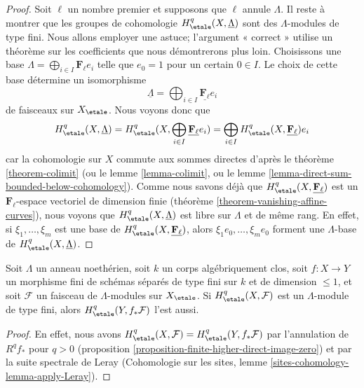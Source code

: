 \begin{proof}
\medskip\noindent
Soit $\ell$ un nombre premier et supposons que $\ell$ annule $\Lambda$.
Il reste à montrer que les groupes de cohomologie
$H^q_\etale(X, \underline{\Lambda})$ sont des $\Lambda$-modules de type fini.
Nous allons employer une astuce; l'argument « correct » utilise
un théorème sur les coefficients que nous démontrerons plus loin.
Choisissons une base $\Lambda = \bigoplus_{i \in I} \mathbf{F}_\ell e_i$
telle que $e_0 = 1$ pour un certain $0 \in I$.
Le choix de cette base détermine un isomorphisme
$$
\underline{\Lambda} = \bigoplus_{i \in I} \underline{\mathbf{F}_\ell} e_i
$$
de faisceaux sur $X_\etale$. Nous voyons donc que
$$
H^q_\etale(X, \underline{\Lambda}) =
H^q_\etale(X, \bigoplus_{i \in I} \underline{\mathbf{F}_\ell} e_i) =
\bigoplus_{i \in I} H^q_\etale(X, \underline{\mathbf{F}_\ell})e_i
$$
car la cohomologie sur $X$ commute aux sommes directes d'après le
théorème \ref{theorem-colimit} (ou le lemme \ref{lemma-colimit}, ou le
lemme \ref{lemma-direct-sum-bounded-below-cohomology}).
Comme nous savons déjà que $H^q_\etale(X, \underline{\mathbf{F}_\ell})$
est un $\mathbf{F}_\ell$-espace vectoriel de dimension finie
(théorème \ref{theorem-vanishing-affine-curves}),
nous voyons que $H^q_\etale(X, \underline{\Lambda})$
est libre sur $\Lambda$ et de même rang.
En effet, si $\xi_1, \ldots, \xi_m$ est une base de
$H^q_\etale(X, \underline{\mathbf{F}_\ell})$, alors
$\xi_1 e_0, \ldots, \xi_m e_0$ forment une $\Lambda$-base de
$H^q_\etale(X, \underline{\Lambda})$.
\end{proof}

\begin{lemma}
\label{lemma-finite-pushforward-coefficients}
Soit $\Lambda$ un anneau noethérien, soit $k$ un corps algébriquement clos,
soit $f : X \to Y$ un morphisme fini de schémas séparés de type fini
sur $k$ et de dimension $\leq 1$, et soit $\mathcal{F}$ un faisceau
de $\Lambda$-modules sur $X_\etale$. Si
$H^q_\etale(X, \mathcal{F})$ est un $\Lambda$-module de type fini, alors
$H^q_\etale(Y, f_*\mathcal{F})$ l'est aussi.
\end{lemma}

\begin{proof}
En effet, nous avons $H^q_\etale(X, \mathcal{F}) = H^q_\etale(Y, f_*\mathcal{F})$
par l'annulation de $R^qf_*$ pour $q > 0$
(proposition \ref{proposition-finite-higher-direct-image-zero}) et par
la suite spectrale de Leray
(Cohomologie sur les sites, lemme \ref{sites-cohomology-lemma-apply-Leray}).
\end{proof}

